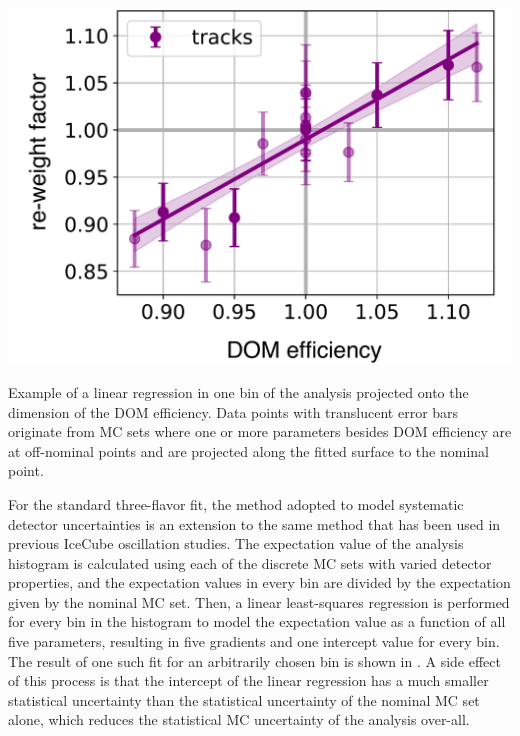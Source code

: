 \begin{marginfigure}[\baselineskip]
    \includegraphics[width=\linewidth]{figures/measurement/systematics/detector/hypersurface_example_v2.pdf} 
    \caption{Example of a linear regression in one bin of the analysis projected onto the dimension of the DOM efficiency. Data points with translucent error bars originate from MC sets where one or more parameters besides DOM efficiency are at off-nominal points and are projected along the fitted surface to the nominal point.}
\end{marginfigure}
For the standard three-flavor fit, the method adopted to model systematic detector uncertainties is an extension to the same method that has been used in previous IceCube oscillation studies\cite{IceCube:2019dqi}. The expectation value of the analysis histogram is calculated using each of the discrete MC sets with varied detector properties, and the expectation values in every bin are divided by the expectation given by the nominal MC set. Then, a linear least-squares regression is performed for every bin in the histogram to model the expectation value as a function of all five parameters, resulting in five gradients and one intercept value for every bin. The result of one such fit for an arbitrarily chosen bin is shown in . A side effect of this process is that the intercept of the linear regression has a much smaller statistical uncertainty than the statistical uncertainty of the nominal MC set alone, which reduces the statistical MC uncertainty of the analysis over-all.

